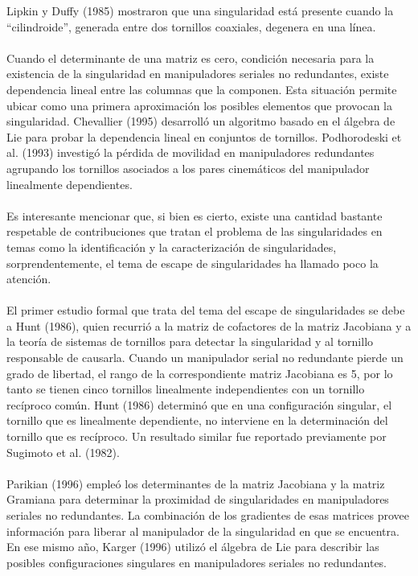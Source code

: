\documentclass[12pt,a4paper]{article}
\begin{document}
Lipkin y Duffy (1985) mostraron que una singularidad está presente cuando la “cilindroide”, generada entre dos tornillos coaxiales, degenera en una línea. \\\\
Cuando el determinante de una matriz es cero, condición necesaria para la existencia de la singularidad en manipuladores seriales no redundantes, existe dependencia lineal entre las columnas que la componen. Esta situación permite ubicar como una primera aproximación los posibles elementos que provocan la singularidad. Chevallier (1995) desarrolló un algoritmo basado en el álgebra de Lie para probar la dependencia lineal en conjuntos de tornillos. Podhorodeski et al. (1993) investigó la pérdida de movilidad en manipuladores redundantes agrupando los tornillos asociados a los pares cinemáticos del manipulador linealmente dependientes. \\\\
Es interesante mencionar que, si bien es cierto, existe una cantidad bastante respetable de contribuciones que tratan el problema de las singularidades en temas como la identificación y la caracterización de singularidades, sorprendentemente, el tema de escape de singularidades ha llamado poco la atención. \\\\
El primer estudio formal que trata del tema del escape de singularidades se debe a Hunt (1986), quien recurrió a la matriz de cofactores de la matriz Jacobiana y a la teoría de sistemas de tornillos para detectar la singularidad y al tornillo responsable de causarla. Cuando un manipulador serial no redundante pierde un grado de libertad, el rango de la correspondiente matriz Jacobiana es 5, por lo tanto se tienen cinco tornillos linealmente independientes con un tornillo recíproco común. Hunt (1986) determinó que en una configuración singular, el tornillo que es linealmente dependiente, no interviene en la determinación del tornillo que es recíproco. Un resultado similar fue reportado previamente por Sugimoto et al. (1982). \\\\
Parikian (1996) empleó los determinantes de la matriz Jacobiana y la matriz Gramiana para determinar la proximidad de singularidades en manipuladores seriales no redundantes. La combinación de los gradientes de esas matrices provee información para liberar al manipulador de la singularidad en que se encuentra. En ese mismo año, Karger (1996) utilizó el álgebra de Lie para describir las posibles configuraciones singulares en manipuladores seriales no redundantes. \\\\
\end{document}
